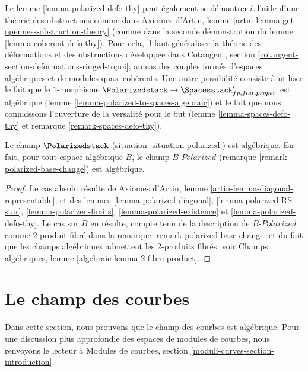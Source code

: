 \begin{remark}
\label{remark-polarized-defo-thy}
Le lemme \ref{lemma-polarized-defo-thy} peut également se démontrer à l'aide
d'une théorie des obstructions comme dans
Axiomes d'Artin, lemme \ref{artin-lemma-get-openness-obstruction-theory}
(comme dans la seconde démonstration du
lemme \ref{lemma-coherent-defo-thy}).
Pour cela, il faut généraliser la théorie des déformations et des obstructions
développée dans
Cotangent, section \ref{cotangent-section-deformations-ringed-topoi}, au cas des
couples formés d'espaces algébriques et de modules quasi-cohérents.
Une autre possibilité consiste à utiliser le fait que le $1$-morphisme
$\Polarizedstack \to \Spacesstack'_{fp, flat, proper}$ est algébrique
(lemme \ref{lemma-polarized-to-spaces-algebraic}) et le fait que nous
connaissons l'ouverture de la versalité pour le but
(lemme \ref{lemma-spaces-defo-thy} et remarque
\ref{remark-spaces-defo-thy}).
\end{remark}

\begin{theorem}
\label{theorem-polarized-algebraic}
Le champ $\Polarizedstack$ (situation \ref{situation-polarized})
est algébrique. En fait, pour tout espace algébrique $B$, le champ
$B\textit{-Polarized}$ (remarque \ref{remark-polarized-base-change})
est algébrique.
\end{theorem}

\begin{proof}
Le cas absolu résulte de
Axiomes d'Artin, lemme \ref{artin-lemma-diagonal-representable},
et des lemmes \ref{lemma-polarized-diagonal},
\ref{lemma-polarized-RS-star},
\ref{lemma-polarized-limits},
\ref{lemma-polarized-existence} et
\ref{lemma-polarized-defo-thy}.
Le cas sur $B$ en résulte, compte tenu de la description de
$B\textit{-Polarized}$ comme $2$-produit fibré dans la remarque
\ref{remark-polarized-base-change} et du fait que les champs algébriques
admettent les $2$-produits fibrés, voir
Champs algébriques, lemme \ref{algebraic-lemma-2-fibre-product}.
\end{proof}

\section{Le champ des courbes}
\label{section-curves}

\noindent
Dans cette section, nous prouvons que le champ des courbes est algébrique.
Pour une discussion plus approfondie des espaces de modules de courbes, nous
renvoyons le lecteur à Modules de courbes, section
\ref{moduli-curves-section-introduction}.

